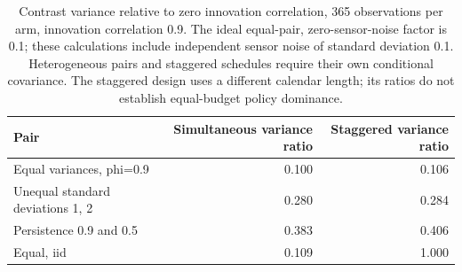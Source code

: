 \begin{table}[!htbp]\centering\small
\begin{lrbox}{\latestTableBox}
\begin{tabular}{lrr}
\toprule
Pair & Simultaneous variance ratio & Staggered variance ratio \\
\midrule
Equal variances, phi=0.9 & 0.100 & 0.106 \\
Unequal standard deviations 1, 2 & 0.280 & 0.284 \\
Persistence 0.9 and 0.5 & 0.383 & 0.406 \\
Equal, iid & 0.109 & 1.000 \\
\bottomrule
\end{tabular}\end{lrbox}
\ifdim\wd\latestTableBox>\linewidth\resizebox{\linewidth}{!}{\usebox{\latestTableBox}}\else\usebox{\latestTableBox}\fi
\caption{Contrast variance relative to zero innovation correlation, 365 observations per arm, innovation correlation 0.9. The ideal equal-pair, zero-sensor-noise factor is 0.1; these calculations include independent sensor noise of standard deviation 0.1. Heterogeneous pairs and staggered schedules require their own conditional covariance. The staggered design uses a different calendar length; its ratios do not establish equal-budget policy dominance.}
\label{tab:latest-slates}
\end{table}
